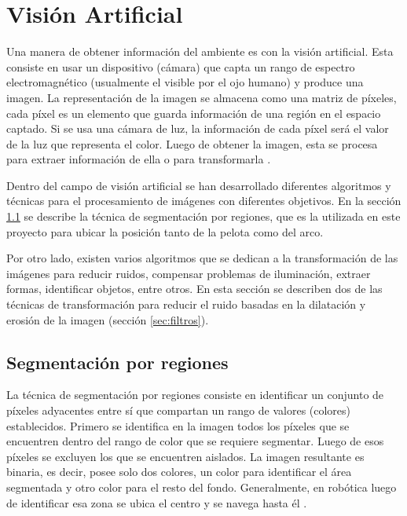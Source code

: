 \section{Visión Artificial} \label{sect:Vision_Artificial}

Una manera de obtener información del ambiente es con la visión artificial. Esta consiste en usar un dispositivo (cámara) que capta un rango de espectro electromagnético (usualmente el visible por el ojo humano) y produce una imagen. La representación de la imagen se almacena como una matriz de píxeles, cada píxel es un elemento que guarda información de una región en el espacio captado. Si se usa una cámara de luz, la información de cada píxel será el valor de la luz que representa el color. Luego de obtener la imagen, esta se procesa para extraer información de ella o para transformarla \cite{AiRobotics}.

Dentro del campo de visión artificial se han desarrollado diferentes algoritmos y t\'ecnicas para el procesamiento de imágenes con diferentes objetivos. En la sección \ref{sec:Segmentacion} se describe la t\'ecnica de segmentaci\'on por regiones, que es la utilizada en este proyecto para ubicar la posición tanto de la pelota como del arco. 

Por otro lado, existen varios algoritmos que se dedican a la transformación de las imágenes para reducir ruidos, compensar problemas de iluminación, extraer formas, identificar objetos, entre otros. En esta sección se describen dos de las técnicas de transformación para reducir el ruido basadas en la dilatación y erosión de la imagen (secci\'on \ref{sec:filtros}). 
 
\subsection{Segmentaci\'on por regiones}\label{sec:Segmentacion}

La técnica de segmentación por regiones consiste en identificar un conjunto de píxeles adyacentes entre sí que compartan un rango de valores (colores) establecidos. Primero se identifica en la imagen todos los píxeles que se encuentren dentro del rango de color que se requiere segmentar. Luego de esos píxeles se excluyen los que se encuentren aislados. La imagen resultante es binaria, es decir, posee solo dos colores, un color para identificar el área segmentada y otro color para el resto del fondo.
Generalmente, en robótica luego de identificar esa zona se ubica el centro y se navega hasta él \cite{AiRobotics}. 

